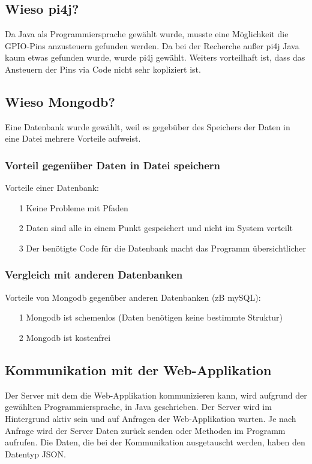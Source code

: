 \subsection{Wieso pi4j?}
Da Java als Programmiersprache gewählt wurde, musste eine Möglichkeit die GPIO-Pins anzusteuern gefunden werden.
Da bei der Recherche außer pi4j Java kaum etwas gefunden wurde, wurde pi4j gewählt. Weiters vorteilhaft ist, dass das Ansteuern der Pins via Code nicht sehr kopliziert ist. 

\subsection{Wieso Mongodb?}
Eine Datenbank wurde gewählt, weil es gegebüber des Speichers der Daten in eine Datei mehrere Vorteile aufweist. 
\subsubsection{Vorteil gegenüber Daten in Datei speichern}
Vorteile einer Datenbank:
\begin{itemize}
\item[1] Keine Probleme mit Pfaden
\item[2] Daten sind alle in einem Punkt gespeichert und nicht im System verteilt
\item[3] Der benötigte Code für die Datenbank macht das Programm übersichtlicher
\end{itemize}
\subsubsection{Vergleich mit anderen Datenbanken}
Vorteile von Mongodb gegenüber anderen Datenbanken (zB mySQL):
\begin{itemize}
\item[1] Mongodb ist schemenlos (Daten benötigen keine bestimmte Struktur)
\item[2] Mongodb ist kostenfrei
\end{itemize}

\subsection{Kommunikation mit der Web-Applikation}
Der Server mit dem die Web-Applikation kommunizieren kann, wird aufgrund der gewählten Programmiersprache, in Java geschrieben. Der Server wird im Hintergrund aktiv sein und auf Anfragen der Web-Applikation warten. Je nach Anfrage wird der Server Daten zurück senden oder Methoden im Programm aufrufen. Die Daten, die bei der Kommunikation ausgetauscht werden, haben den Datentyp JSON.


